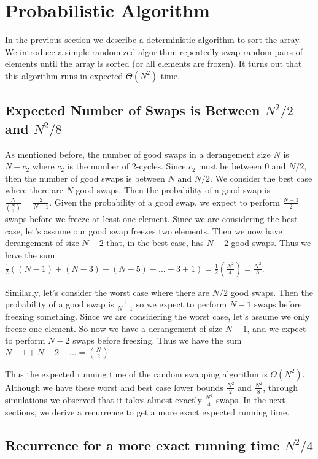 \documentclass{article}
\begin{document}
\section{Probabilistic Algorithm}
In the previous section we describe a deterministic algorithm to sort the array. We introduce
a simple randomized algorithm: repeatedly swap random pairs of elements until the array is sorted
(or all elements are frozen). It turns out that this algorithm runs in expected $\Theta(N^2)$
time. 

\subsection{Expected Number of Swaps is Between $N^2/2$ and $N^2/8$}
As mentioned before, the number of good swaps in a derangement size $N$ 
is $N - c_2$ where $c_2$ is the number
of $2$-cycles. Since $c_2$ must be between $0$ and $N/2$, then the number of good swaps
is between $N$ and $N/2$. We consider the best case where there are $N$ good swaps.
Then the probability of a good swap is $\frac{N}{{N \choose 2}} = \frac{2}{N - 1}$.
Given the probability of a good swap, we expect to perform $\frac{N - 1}{2}$ swaps before we 
freeze at least one element. Since we are considering the best case, let's assume our
good swap freezes two elements. Then we now have derangement of size $N - 2$ that, in the best
case, has $N - 2$ good swaps. Thus we have the sum
$\frac{1}{2}((N - 1) + (N - 3) + (N - 5) + ... + 3 + 1) = \frac{1}{2}(\frac{N^2}{4}) = \frac{N^2}{8} $.

Similarly, let's consider the worst case where there are $N/2$ good swaps. Then the probability
of a good swap is $\frac{1}{N - 1}$ so we expect to perform $N - 1$ swaps before freezing
something. Since we are considering the worst case, let's assume we only freeze one element.
So now we have a derangement of size $N - 1$, and we expect to perform $N - 2$ swaps before
freezing. Thus we have the sum
$ N - 1 + N - 2 + ... = {N \choose 2} $

Thus the expected running time of the random swapping algorithm is $\Theta(N^2)$.
Although we have these worst and best case lower bounds $\frac{N^2}{2}$ and $\frac{N^2}{8}$,
through simulations we observed that it takes almost exactly $\frac{N^2}{4}$ swaps.
In the next sections, we derive a recurrence to get a more exact expected running time.

\subsection{Recurrence for a more exact running time $N^2/4$}
\end{document}
